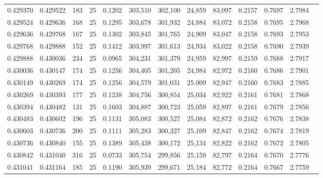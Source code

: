 \begin{tabular}{rrrrrrrrrrrrr}
0.429370 & 0.429522 &   183 &  25 &                                     0.1202 & 303,510 & 302,100 &  24,859 &  83,097 & 0.2157 & 0.7697 & 2.7984 \\
0.429524 & 0.429636 &   168 &  25 &                                     0.1295 & 303,678 & 301,932 &  24,884 &  83,072 & 0.2158 & 0.7695 & 2.7968 \\
0.429636 & 0.429768 &   167 &  25 &                                     0.1302 & 303,845 & 301,765 &  24,909 &  83,047 & 0.2158 & 0.7693 & 2.7953 \\
0.429768 & 0.429888 &   152 &  25 &                                     0.1412 & 303,997 & 301,613 &  24,934 &  83,022 & 0.2158 & 0.7690 & 2.7939 \\
0.429888 & 0.430036 &   234 &  25 &                                     0.0965 & 304,231 & 301,379 &  24,959 &  82,997 & 0.2159 & 0.7688 & 2.7917 \\
0.430036 & 0.430147 &   174 &  25 &                                     0.1256 & 304,405 & 301,205 &  24,984 &  82,972 & 0.2160 & 0.7686 & 2.7901 \\
0.430149 & 0.430269 &   174 &  25 &                                     0.1256 & 304,579 & 301,031 &  25,009 &  82,947 & 0.2160 & 0.7683 & 2.7885 \\
0.430269 & 0.430393 &   177 &  25 &                                     0.1238 & 304,756 & 300,854 &  25,034 &  82,922 & 0.2161 & 0.7681 & 2.7868 \\
0.430394 & 0.430482 &   131 &  25 &                                     0.1603 & 304,887 & 300,723 &  25,059 &  82,897 & 0.2161 & 0.7679 & 2.7856 \\
0.430483 & 0.430602 &   196 &  25 &                                     0.1131 & 305,083 & 300,527 &  25,084 &  82,872 & 0.2162 & 0.7676 & 2.7838 \\
0.430603 & 0.430736 &   200 &  25 &                                     0.1111 & 305,283 & 300,327 &  25,109 &  82,847 & 0.2162 & 0.7674 & 2.7819 \\
0.430736 & 0.430840 &   155 &  25 &                                     0.1389 & 305,438 & 300,172 &  25,134 &  82,822 & 0.2162 & 0.7672 & 2.7805 \\
0.430842 & 0.431040 &   316 &  25 &                                     0.0733 & 305,754 & 299,856 &  25,159 &  82,797 & 0.2164 & 0.7670 & 2.7776 \\
0.431041 & 0.431164 &   185 &  25 &                                     0.1190 & 305,939 & 299,671 &  25,184 &  82,772 & 0.2164 & 0.7667 & 2.7759 \\

\end{tabular}
